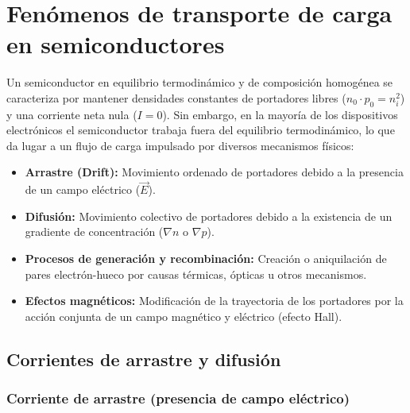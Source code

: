 
\chapter{Fenómenos de transporte de carga en semiconductores}

Un semiconductor en equilibrio termodinámico y de composición homogénea se caracteriza por mantener densidades constantes de portadores libres ($n_0 \cdot p_0 = n_i^2$) y una corriente neta nula ($I = 0$). Sin embargo, en la mayoría de los dispositivos electrónicos el semiconductor trabaja fuera del equilibrio termodinámico, lo que da lugar a un flujo de carga impulsado por diversos mecanismos físicos:
\begin{itemize}
    \item \textbf{Arrastre (Drift):} Movimiento ordenado de portadores debido a la presencia de un campo eléctrico ($\vec{E}$).
    \item \textbf{Difusión:} Movimiento colectivo de portadores debido a la existencia de un gradiente de concentración ($\nabla n$ o $\nabla p$).
    \item \textbf{Procesos de generación y recombinación:} Creación o aniquilación de pares electrón-hueco por causas térmicas, ópticas u otros mecanismos.
    \item \textbf{Efectos magnéticos:} Modificación de la trayectoria de los portadores por la acción conjunta de un campo magnético y eléctrico (efecto Hall).
\end{itemize}

\newpage
\section{Corrientes de arrastre y difusión}

\subsection{Corriente de arrastre (presencia de campo eléctrico)}

